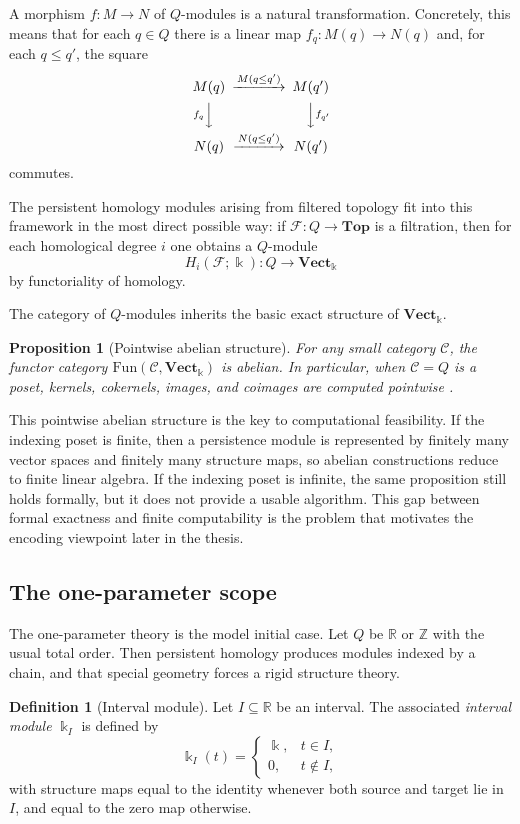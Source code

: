 \documentclass[11pt]{article}
\newcommand{\R}{\mathbb{R}}
\newcommand{\Z}{\mathbb{Z}}
\newcommand{\kk}{\Bbbk}
\newtheorem{proposition}[theorem]{Proposition}
\theoremstyle{definition}
\newtheorem{defn}[theorem]{Definition}
\theoremstyle{remark}
\begin{document}
A morphism $f : M \to N$ of $Q$-modules is a natural transformation. Concretely, this means that for each $q \in Q$ there is a linear map $f_q : M(q) \to N(q)$ and, for each $q \leq q'$, the square
\[
\begin{CD}
M(q) @>{M(q\leq q')}>> M(q')\\
@V{f_q}VV @VV{f_{q'}}V\\
N(q) @>{N(q\leq q')}>> N(q')
\end{CD}
\]
commutes.

The persistent homology modules arising from filtered topology fit into this framework in the most direct possible way: if $\mathcal{F} : Q \to \mathbf{Top}$ is a filtration, then for each homological degree $i$ one obtains a $Q$-module
\[
H_i(\mathcal{F};\kk) : Q \longrightarrow \mathbf{Vect}_{\kk}
\]
by functoriality of homology.

The category of $Q$-modules inherits the basic exact structure of $\mathbf{Vect}_{\kk}$.

\begin{proposition}[Pointwise abelian structure]
For any small category $\mathcal{C}$, the functor category $\mathrm{Fun}(\mathcal{C},\mathbf{Vect}_{\kk})$ is abelian. In particular, when $\mathcal{C}=Q$ is a poset, kernels, cokernels, images, and coimages are computed pointwise \cite{Mac98,Wei94}.
\end{proposition}

This pointwise abelian structure is the key to computational feasibility. If the indexing poset is finite, then a persistence module is represented by finitely many vector spaces and finitely many structure maps, so abelian constructions reduce to finite linear algebra. If the indexing poset is infinite, the same proposition still holds formally, but it does not provide a usable algorithm. This gap between formal exactness and finite computability is the problem that motivates the encoding viewpoint later in the thesis.

\subsection{The one-parameter scope}

The one-parameter theory is the model initial case. Let $Q$ be $\R$ or $\Z$ with the usual total order. Then persistent homology produces modules indexed by a chain, and that special geometry forces a rigid structure theory.

\begin{defn}[Interval module]
Let $I \subseteq \R$ be an interval. The associated \emph{interval module} $\kk_I$ is defined by
\[
\kk_I(t)=
\begin{cases}
\kk, & t \in I,\\
0, & t \notin I,
\end{cases}
\]
with structure maps equal to the identity whenever both source and target lie in $I$, and equal to the zero map otherwise.
\end{defn}
\end{document}
